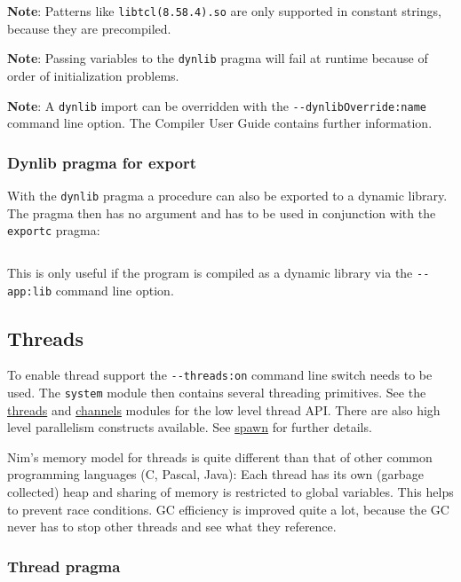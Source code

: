 \textbf{Note}: Patterns like
\texttt{libtcl(\textbar{}8.5\textbar{}8.4).so} are only supported in
constant strings, because they are precompiled.

\textbf{Note}: Passing variables to the \texttt{dynlib} pragma will fail
at runtime because of order of initialization problems.

\textbf{Note}: A \texttt{dynlib} import can be overridden with the
\texttt{-\/-dynlibOverride:name} command line option. The Compiler User
Guide contains further information.

\hypertarget{dynlib-pragma-for-export}{%
\subsubsection{Dynlib pragma for
export}\label{dynlib-pragma-for-export}}

With the \texttt{dynlib} pragma a procedure can also be exported to a
dynamic library. The pragma then has no argument and has to be used in
conjunction with the \texttt{exportc} pragma:

\begin{verbatim}
\end{verbatim}

This is only useful if the program is compiled as a dynamic library via
the \texttt{-\/-app:lib} command line option.

\hypertarget{threads}{%
\subsection{Threads}\label{threads}}

To enable thread support the \texttt{-\/-threads:on} command line switch
needs to be used. The \texttt{system} module then contains several
threading primitives. See the \href{threads.html}{threads} and
\href{channels.html}{channels} modules for the low level thread API.
There are also high level parallelism constructs available. See
\href{manual_experimental.html\#parallel-amp-spawn}{spawn} for further
details.

Nim's memory model for threads is quite different than that of other
common programming languages (C, Pascal, Java): Each thread has its own
(garbage collected) heap and sharing of memory is restricted to global
variables. This helps to prevent race conditions. GC efficiency is
improved quite a lot, because the GC never has to stop other threads and
see what they reference.

\hypertarget{thread-pragma}{%
\subsubsection{Thread pragma}\label{thread-pragma}}


